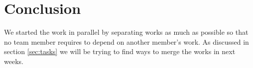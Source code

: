 \section{Conclusion}
\label{sec:conclusion}
We started the work in parallel by separating works as much as possible so that no team member requires to depend on another member's work. As discussed in section \ref{sec:tasks} we will be trying to find ways to merge the works in next weeks. 
